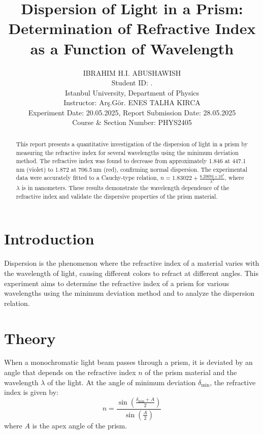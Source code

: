 \documentclass[journal]{IEEEtran}
\begin{document}
\title{Dispersion of Light in a Prism: Determination of Refractive Index as a Function of Wavelength}
\author{IBRAHIM H.I. ABUSHAWISH \\

{\small Student ID: \hspace{1.5cm}. \\ 
Istanbul University, Department of Physics \\
Instructor: Arş.Gör. ENES TALHA KIRCA\\
Experiment Date: 20.05.2025, Report Submission Date: 28.05.2025 \\
Course \& Section Number: PHYS2405}}


\maketitle
\begin{abstract}
    This report presents a quantitative investigation of the dispersion of light in a prism by measuring the refractive index for several wavelengths using the minimum deviation method. The refractive index was found to decrease from approximately 1.846 at 447.1\,nm (violet) to 1.872 at 706.5\,nm (red), confirming normal dispersion. The experimental data were accurately fitted to a Cauchy-type relation, \( n = 1.83022 + \frac{8.20694 \times 10^3}{\lambda^2} \), where \( \lambda \) is in nanometers. These results demonstrate the wavelength dependence of the refractive index and validate the dispersive properties of the prism material.
\end{abstract}

\section{Introduction}
Dispersion is the phenomenon where the refractive index of a material varies with the wavelength of light, causing different colors to refract at different angles. This experiment aims to determine the refractive index of a prism for various wavelengths using the minimum deviation method and to analyze the dispersion relation.

\section*{Theory}
When a monochromatic light beam passes through a prism, it is deviated by an angle that depends on the refractive index \( n \) of the prism material and the wavelength \( \lambda \) of the light. At the angle of minimum deviation \( \delta_{\min} \), the refractive index is given by:
\begin{equation}
n = \frac{\sin\left(\frac{\delta_{\min} + A}{2}\right)}{\sin\left(\frac{A}{2}\right)}
\label{eq:refractive_index}
\end{equation}
where \( A \) is the apex angle of the prism.
\end{document}
